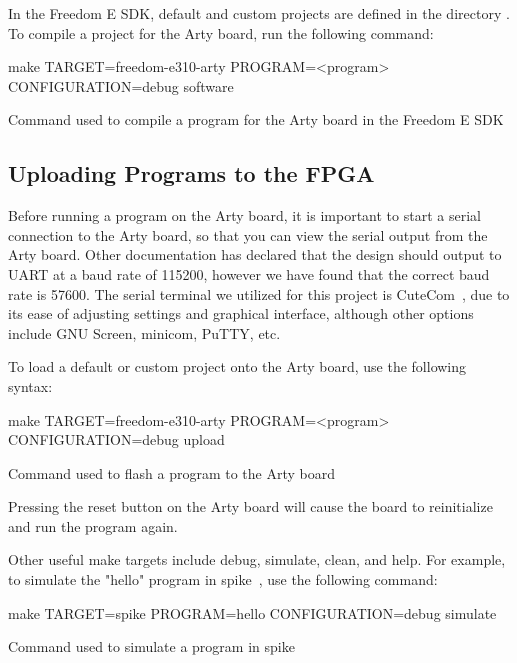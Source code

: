 In the Freedom E SDK, default and custom projects are defined in the directory .
To compile a project for the Arty board, run the following command:

\begin{listing}[h!tbp]
  \begin{bashsource}
    make TARGET=freedom-e310-arty PROGRAM=<program> CONFIGURATION=debug software
  \end{bashsource}
  \caption{Command used to compile a program for the Arty board in the Freedom E SDK}
  \label{lst:compile_in_sdk}
\end{listing}

\subsection{Uploading Programs to the FPGA}\label{sec:Upload_Programs_to_Flashed_FPGA}
Before running a program on the Arty board, it is important to start a serial connection to the Arty board, so that you can view the serial output from the Arty board.
Other documentation has declared that the design should output to UART at a baud rate of 115200, however we have found that the correct baud rate is 57600.
The serial terminal we utilized for this project is CuteCom~\cite{CuteCom}, due to its ease of adjusting settings and graphical interface, although other options include GNU Screen, minicom, PuTTY, etc.

To load a default or custom project onto the Arty board, use the following syntax:

\begin{listing}[h!tbp]
  \begin{bashsource}
    make TARGET=freedom-e310-arty PROGRAM=<program> CONFIGURATION=debug upload
  \end{bashsource}
  \caption{Command used to flash a program to the Arty board}
  \label{lst:upload_to_arty}
\end{listing}

Pressing the reset button on the Arty board will cause the board to reinitialize and run the program again.

Other useful make targets include debug, simulate, clean, and help.
For example, to simulate the "hello" program in \gls{spike}~\cite{SpikeSimulator}, use the following command:

\begin{listing}[h!tbp]
  \begin{bashsource}
    make TARGET=spike PROGRAM=hello CONFIGURATION=debug simulate
  \end{bashsource}
  \caption{Command used to simulate a program in \gls{spike}}
  \label{lst:simulate_in_spike}
\end{listing}


